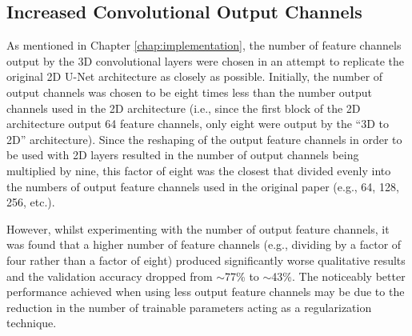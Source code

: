 \subsection{Increased Convolutional Output Channels}

As mentioned in Chapter \ref{chap:implementation}, the number of feature channels output by the 3D convolutional layers were chosen in an attempt to replicate the original 2D U-Net architecture as closely as possible. Initially, the number of output channels was chosen to be eight times less than the number output channels used in the 2D architecture (i.e., since the first block of the 2D architecture output 64 feature channels, only eight were output by the ``3D to 2D'' architecture). Since the reshaping of the output feature channels in order to be used with 2D layers resulted in the number of output channels being multiplied by nine, this factor of eight was the closest that divided evenly into the numbers of output feature channels used in the original paper (e.g., 64, 128, 256, etc.).

However, whilst experimenting with the number of output feature channels, it was found that a higher number of feature channels (e.g., dividing by a factor of four rather than a factor of eight) produced significantly worse qualitative results and the validation accuracy dropped from ${\sim}$77\% to ${\sim}$43\%. The noticeably better performance achieved when using less output feature channels may be due to the reduction in the number of trainable parameters acting as a regularization technique.




